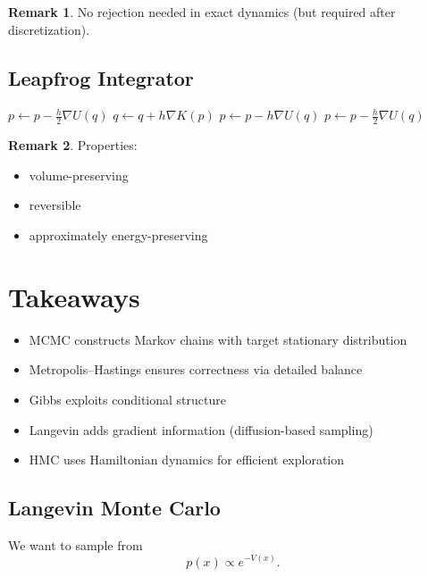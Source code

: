 \documentclass[12pt,oneside]{book}
\numberwithin{equation}{section}
\theoremstyle{definition}
\newtheorem{remark}{Remark}[section]
\theoremstyle{plain}
\theoremstyle{remark}
\begin{document}
\begin{remark}
No rejection needed in exact dynamics (but required after discretization).
\end{remark}


\subsection*{Leapfrog Integrator}

\begin{algorithm}
\caption{Leapfrog}
\begin{algorithmic}
\State $p \leftarrow p - \frac{h}{2}\nabla U(q)$
\State $q \leftarrow q + h\nabla K(p)$
\State $p \leftarrow p - h\nabla U(q)$
\EndFor
\State $p \leftarrow p - \frac{h}{2}\nabla U(q)$
\end{algorithmic}
\end{algorithm}

\begin{remark}
Properties:
\begin{itemize}
\item volume-preserving
\item reversible
\item approximately energy-preserving
\end{itemize}
\end{remark}


\section*{Takeaways}

\begin{itemize}
\item MCMC constructs Markov chains with target stationary distribution
\item Metropolis--Hastings ensures correctness via detailed balance
\item Gibbs exploits conditional structure
\item Langevin adds gradient information (diffusion-based sampling)
\item HMC uses Hamiltonian dynamics for efficient exploration
\end{itemize}

\subsection*{Langevin Monte Carlo}

We want to sample from
\[
p(x) \propto e^{-V(x)}.
\]
\end{document}
